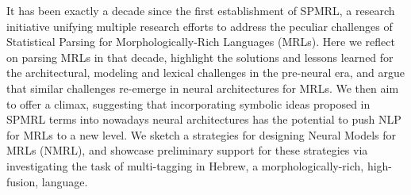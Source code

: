 It has been exactly a decade since the first establishment of  SPMRL, a  research initiative unifying  multiple research efforts to  address the peculiar challenges of Statistical Parsing for Morphologically-Rich Languages (MRLs). Here we reflect on parsing MRLs in that decade,  highlight the solutions and lessons  learned for the architectural, modeling and lexical challenges  in the pre-neural era, and argue that similar challenges  re-emerge  in  neural architectures for MRLs. We then aim to offer a climax, suggesting that  incorporating symbolic ideas proposed in  SPMRL terms into nowadays neural architectures has the potential to push NLP for MRLs to a new level. We  sketch  a strategies for designing Neural Models for MRLs (NMRL), and showcase preliminary  support for these strategies via  investigating the task of multi-tagging in  Hebrew, a morphologically-rich,  high-fusion, language.
